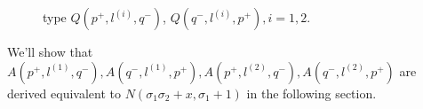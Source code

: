 \documentclass[a4paper, reqno]{amsart}
\theoremstyle{definition}
\theoremstyle{remark}
\numberwithin{equation}{section}
\begin{document}
\begin{figure}[H]
{
    }
    
    \caption{type $Q(p^{+},l^{(i)},q^{-})$,  $Q(q^{-},l^{(i)},p^{+}), i=1,2.$
   }
    \label{fig:enter-label}
\end{figure}

We'll show that $ A(p^{+},l^{(1)},q^{-}), A(q^{-},l^{(1)},p^{+}) ,A(p^{+},l^{(2)},q^{-}),A(q^{-},l^{(2)},p^{+})$ are derived equivalent to $N(\sigma_1\sigma_2+x,\sigma_1+1) $ in the following section. 



\newpage
\end{document}
